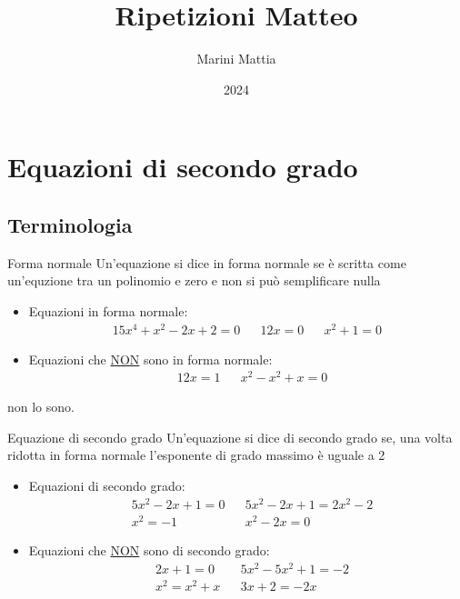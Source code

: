 
\usepackage{contour}

\title{Ripetizioni Matteo}
\author{Marini Mattia}
\date{2024}


\maketitle
{}
\tableofcontents
\listofdefs

\newpage
\section{Equazioni di secondo grado}
\subsection{Terminologia}
\begin{definizione}{Forma normale}
	Un'equazione si dice in forma normale se è scritta come un'equzione tra un polinomio e zero e non si può semplificare nulla
\end{definizione}
\begin{itemize}
	\item Equazioni in forma normale:
	      \begin{align*}
		      15x^{4} + x^2  -2x + 2 = 0 &  & 12x = 0 &  & x^2 + 1 = 0
	      \end{align*}
	\item Equazioni che \underline{NON} sono in forma normale:
	      \begin{align*}
		       & 12x = 1 &  & x^2 - x^2  +x = 0
	      \end{align*}
\end{itemize}
non lo sono.

\begin{definizione}{Equazione di secondo grado}
	Un'equazione si dice di secondo grado se, una volta ridotta in forma normale l'esponente di grado massimo è uguale a 2
\end{definizione}
\begin{itemize}
	\item Equazioni di secondo grado:
	      \begin{align*}
		       & 5x^2 -2x + 1 = 0 &  & 5x^2 -2x + 1 = 2x^2  -2 \\
		       & x^2  = -1        &  & x^2 -2x = 0
	      \end{align*}
	\item Equazioni che \underline{NON} sono di secondo grado:
	      \begin{align*}
		       & 2x + 1 = 0     &  & 5x^2 -5x^2  + 1 =  -2 \\
		       & x^2  = x^2 + x &  & 3x + 2 = -2x
	      \end{align*}
\end{itemize}

